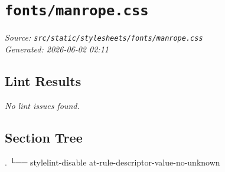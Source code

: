 
\section{\texttt{fonts/manrope.css}}
\textit{Source: \texttt{src/static/stylesheets/fonts/manrope.css}} \\
\textit{Generated: 2026-06-02 02:11} \\

\subsection{Lint Results}
\textit{No lint issues found.} \\

\subsection{Section Tree}
\begingroup
\linespread{0.9}\selectfont
\begin{verbnobox}[\FiraCode]
.
└── stylelint-disable at-rule-descriptor-value-no-unknown
\end{verbnobox}
\endgroup
